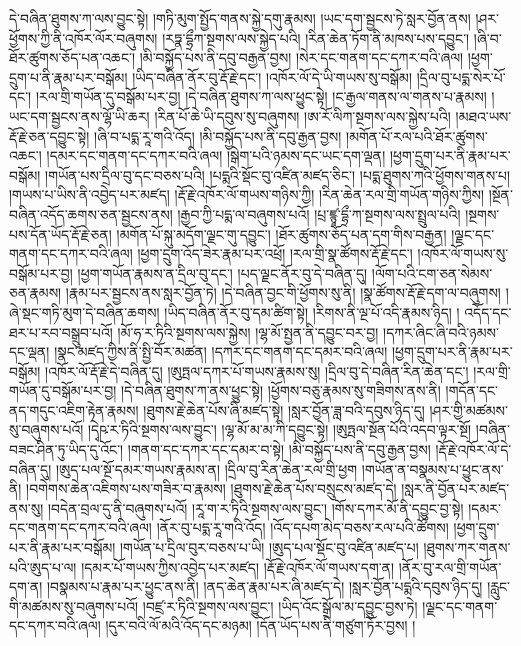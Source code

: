 དེ་བཞིན་ཐུགས་ཀ་ལས་བྱུང་སྟེ། །གཏི་མུག་སྤྱོད་གནས་སྐྱེ་དགུ་རྣམས། །ཡང་དག་སྦྱངས་ཏེ་སླར་བྱོན་ནས། །ཤར་ཕྱོགས་ཀྱི་ནི་འཁོར་ལོར་བཞུགས། །རཏྣ་དྷྲྀཀ་སྔགས་ལས་སྐྱེད་པའི། །རིན་ཆེན་ཏོག་ནི་མཁས་པས་དབྱུང་། །ཞི་བ་ཐོར་ཚུགས་ཅོད་པན་འཆང་། །མི་བསྐྱོད་པས་ནི་དབུ་བརྒྱན་བྱས། །སེར་དང་གནག་དང་དཀར་བའི་ཞལ། །ཕྱག་དྲུག་པ་ནི་རྣམ་པར་བསྒོམ། །ཡིད་བཞིན་ནོར་བུ་རྡོ་རྗེ་དང་། །འཁོར་ལོ་དེ་ཡི་གཡས་སུ་བསྒོམ། །དྲིལ་བུ་པདྨ་སེར་པོ་དང་། །རལ་གྲི་གཡོན་དུ་བསྒོམ་པར་བྱ། །དེ་བཞིན་ཐུགས་ཀ་ལས་ཕྱུང་སྟེ། །ང་རྒྱལ་གནས་ལ་གནས་པ་རྣམས། །ཡང་དག་སྦྱངས་ནས་ལྷོ་ཡི་ཆར། །རིན་པོ་ཆེ་ཡི་དབུས་སུ་བཞུགས། །ཨ་རོ་ལིཀ་སྔགས་ལས་སྐྱེས་པའི། །མཐའ་ཡས་རྡོ་རྗེ་ཅན་དབྱུང་སྟེ། །ཞི་བ་པདྨ་རཱ་གའི་འོད། །མི་བསྐྱོད་པས་ནི་དབུ་རྒྱན་བྱས། །མགོན་པོ་རལ་པའི་ཐོར་ཚུགས་འཆང་། །དམར་དང་གནག་དང་དཀར་བའི་ཞལ། །སྒེག་པའི་ཉམས་དང་ཡང་དག་ལྡན། །ཕྱག་དྲུག་པར་ནི་རྣམ་པར་བསྒོམ། །གཡོན་པས་དྲིལ་བུ་དང་བཅས་པའི། །པདྨའི་སྡོང་བུ་འཛིན་མཛད་ཅིང་། །པདྨ་ཐུགས་ཀའི་ཕྱོགས་གནས་པ། །གཡས་པ་ཡིས་ནི་འབྱེད་པར་མཛད། །རྡོ་རྗེ་འཁོར་ལོ་གཡས་གཉིས་ཀྱི། །རིན་ཆེན་རལ་གྲི་གཡོན་གཉིས་ཀྱིས། །སྔོན་བཞིན་འདོད་ཆགས་ཅན་སྦྱངས་ནས། །རྒྱབ་ཀྱི་པདྨ་ལ་བཞུགས་པའོ། །པྲ་ཛྙཱ་དྷྲྀ་ཀ་སྔགས་ལས་སྤྲུལ་པའི། །སྔགས་པས་དོན་ཡོད་རྡོ་རྗེ་ཅན། །མགོན་པོ་སྐུ་མདོག་ལྗང་གུ་དབྱུང་། །ཐོར་ཚུགས་ཅོད་པན་དག་གིས་བརྒྱན། །ལྗང་དང་གནག་དང་དཀར་བའི་ཞལ། །ཕྱག་དྲུག་འོད་ཟེར་རྣམ་པར་འཕྲོ། །རལ་གྲི་སྣ་ཚོགས་རྡོ་རྗེ་དང་། །འཁོར་ལོ་གཡས་སུ་བསྒོམ་པར་བྱ། །ཕྱག་གཡོན་རྣམས་ན་དྲིལ་བུ་དང་། །པད་ལྗང་ནོར་བུ་དེ་བཞིན་དུ། །ལོག་པའི་ངག་ཅན་སེམས་ཅན་རྣམས། །རྣམ་པར་སྦྱངས་ནས་སླར་བྱོན་ཏེ། །དེ་བཞིན་བྱང་གི་ཕྱོགས་སུ་ནི། །སྣ་ཚོགས་རྡོ་རྗེ་དག་ལ་བཞུགས། །ཞེ་སྡང་གཏི་མུག་དེ་བཞིན་ཆགས། །ཡིད་བཞིན་ནོར་བུ་དམ་ཚིག་སྟེ། །རིགས་ནི་ལྔ་པོ་འདི་རྣམས་ཉིད། །
འདོད་དང་ཐར་པ་རབ་བསྒྲུབ་པའོ། །མོ་ཧ་ར་ཏིའི་སྔགས་ལས་སྐྱེས། །ལྷ་མོ་སྤྱན་ནི་དབྱུང་བར་བྱ། །དཀར་ཞིང་ཞི་བའི་ཉམས་དང་ལྡན། །སྣང་མཛད་ཀྱིས་ནི་སྤྱི་བོར་མཚན། །དཀར་དང་གནག་དང་དམར་བའི་ཞལ། །ཕྱག་དྲུག་པར་ནི་རྣམ་པར་བསྒོམ། །འཁོར་ལོ་རྡོ་རྗེ་དེ་བཞིན་དུ། །ཨུཏྤལ་དཀར་པོ་གཡས་རྣམས་སུ། །དྲིལ་བུ་དེ་བཞིན་རིན་ཆེན་དང་། །རལ་གྲི་གཡོན་དུ་བསྒོམ་པར་བྱ། །དེ་བཞིན་ཐུགས་ཀ་ནས་ཕྱུང་སྟེ། །ཕྱོགས་བཅུ་རྣམས་སུ་གཟིགས་ནས་ནི། །གདོན་དང་ནད་གདུང་འཇིག་རྟེན་རྣམས། །ཐུགས་རྗེ་ཆེན་པོས་ཞི་མཛད་སྟེ། །སླར་བྱོན་ཟླ་བའི་དབུས་ཉིད་དུ། །ཤར་གྱི་མཚམས་སུ་བཞུགས་པའོ། །དྭེཥ་ར་ཏིའི་སྔགས་ལས་བྱུང་། །ལྷ་མོ་མ་མ་ཀི་དབྱུང་སྟེ། །ཨུཏྤལ་སྔོན་པོའི་འདབ་ལྟར་སྔོ། །བཞིན་བཟང་ཤིན་ཏུ་ཡིད་དུ་འོང་། །གནག་དང་དཀར་དང་དམར་བ་སྟེ། །མི་བསྐྱོད་པས་ནི་དབུ་རྒྱན་བྱས། །རྡོ་རྗེ་འཁོར་ལོ་དེ་བཞིན་དུ། །ཨུད་པལ་སྔོ་དམར་གཡས་རྣམས་ན། །དྲིལ་བུ་རིན་ཆེན་རལ་གྲི་ཕྱག །གཡོན་ན་བསྣམས་པ་ཕྱུང་ནས་ནི། །བགེགས་ཆེན་འཇིགས་པས་གཟིར་བ་རྣམས། །ཐུགས་རྗེ་ཆེན་པོས་བསྲུངས་མཛད་དེ། །སླར་ནི་བྱོན་པར་མཛད་ནས་སུ། །བདེན་བྲལ་དུ་ནི་བཞུགས་པའོ། །རཱ་ག་ར་ཏིའི་སྔགས་ལས་བྱུང་། །གོས་དཀར་མོ་ནི་དབྱུང་བྱ་སྟེ། །དམར་དང་གནག་དང་དཀར་བའི་ཞལ། །ནོར་བུ་པདྨ་རཱ་གའི་འོད། །འོད་དཔག་མེད་བཅས་རལ་པའི་ཚོགས། །ཕྱག་དྲུག་པར་ནི་རྣམ་པར་བསྒོམ། །གཡོན་པ་དྲིལ་བུར་བཅས་པ་ཡི། །ཨུད་པལ་སྡོང་བུ་འཛིན་མཛད་པ། །ཐུགས་ཀར་གནས་པའི་ཨུད་པ་ལ། །དམར་པོ་གཡས་ཀྱིས་འབྱེད་པར་མཛད། །རྡོ་རྗེ་འཁོར་ལོ་གཡས་དག་ན། །ནོར་བུ་རལ་གྲི་གཡོན་དག་ན། །བསྣམས་པ་རྣམ་པར་ཕྱུང་ནས་ནི། །ནད་ཆེན་རྣམ་པར་ཞི་མཛད་དེ། །སླར་བྱོན་པདྨའི་དབུས་ཉིད་དུ། །རླུང་གི་མཚམས་སུ་བཞུགས་པའོ། །བཛྲ་ར་ཏིའི་སྔགས་ལས་བྱུང་། །ཡིད་འོང་སྒྲོལ་མ་དབྱུང་བྱས་ཏེ། །ལྗང་དང་གནག་དང་དཀར་བའི་ཞལ། །དུར་བའི་ལོ་མའི་འོད་དང་མཉམ། །དོན་ཡོད་པས་ནི་གཙུག་ཏོར་བྱས། །
